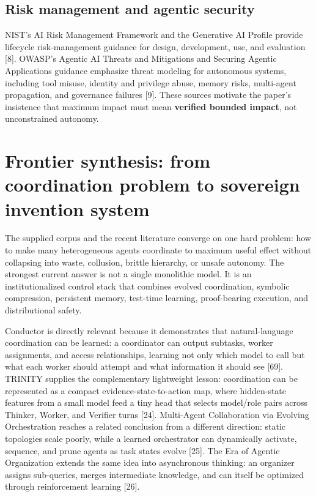 \documentclass[11pt]{article}
\begin{document}
\subsection{Risk management and agentic
security}\label{risk-management-and-agentic-security}

NIST's AI Risk Management Framework and the Generative AI Profile
provide lifecycle risk-management guidance for design, development, use,
and evaluation {[}8{]}. OWASP's Agentic AI Threats and Mitigations and
Securing Agentic Applications guidance emphasize threat modeling for
autonomous systems, including tool misuse, identity and privilege abuse,
memory risks, multi-agent propagation, and governance failures {[}9{]}.
These sources motivate the paper's insistence that maximum impact must
mean \textbf{verified bounded impact}, not unconstrained autonomy.

\section{Frontier synthesis: from coordination problem to sovereign
invention
system}\label{frontier-synthesis-from-coordination-problem-to-sovereign-invention-system}

The supplied corpus and the recent literature converge on one hard
problem: how to make many heterogeneous agents coordinate to maximum
useful effect without collapsing into waste, collusion, brittle
hierarchy, or unsafe autonomy. The strongest current answer is not a
single monolithic model. It is an institutionalized control stack that
combines evolved coordination, symbolic compression, persistent memory,
test-time learning, proof-bearing execution, and distributional safety.

Conductor is directly relevant because it demonstrates that
natural-language coordination can be learned: a coordinator can output
subtasks, worker assignments, and access relationships, learning not
only which model to call but what each worker should attempt and what
information it should see {[}69{]}. TRINITY supplies the complementary
lightweight lesson: coordination can be represented as a compact
evidence-state-to-action map, where hidden-state features from a small
model feed a tiny head that selects model/role pairs across Thinker,
Worker, and Verifier turns {[}24{]}. Multi-Agent Collaboration via
Evolving Orchestration reaches a related conclusion from a different
direction: static topologies scale poorly, while a learned orchestrator
can dynamically activate, sequence, and prune agents as task states
evolve {[}25{]}. The Era of Agentic Organization extends the same idea
into asynchronous thinking: an organizer assigns sub-queries, merges
intermediate knowledge, and can itself be optimized through
reinforcement learning {[}26{]}.
\end{document}
